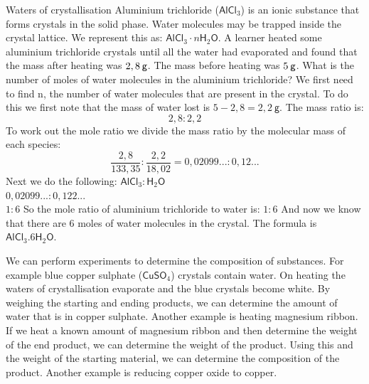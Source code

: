     \noindent
\par
            \label{m38712*eid672431}\vspace{-3cm} 
      \noindent
      \begin{wex}{Waters of crystallisation}{
\label{m38712*pid47982}
\label{m38712*id64827}Aluminium trichloride (${\mathsf{AlCl}}_{3}$) is an ionic substance that forms crystals in the solid phase. Water molecules may be trapped inside the crystal lattice. We represent this as: ${\mathsf{AlCl}}_{3}\ensuremath{\cdot}n{\mathsf{H}}_{2}\mathsf{O}$. A learner heated some aluminium trichloride crystals until all the water had evaporated and found that the mass after heating was $2,8\phantom{\rule{2pt}{0ex}}\mathsf{g}$. The mass before heating was $5\phantom{\rule{2pt}{0ex}}\mathsf{g}$. What is the number of moles of water molecules in the aluminium trichloride?
\vspace{5pt}}
{
We first need to find n, the number of water molecules that are present in the crystal. To do this we first note that the mass of water lost is $5-2,8=2,2~\mathsf{g}$.
  \label{m38712*id3892}The mass ratio is:
 \label{m38712*eid744672}\nopagebreak\noindent{}
    \begin{equation*}
    2,8:2,2
      \end{equation*}
To work out the mole ratio we divide the mass ratio by the molecular mass of each species:
\label{m38712*eid7459432}\nopagebreak\noindent{}
    \begin{equation*}
    \frac{2,8}{133,35}:\frac{2,2}{18,02}=0,02099...:0,12...
      \end{equation*}
Next we do the following:
$\mathsf{AlCl}_{3}:\mathsf{H}_{2}\mathsf{O}$\\
$0,02099...:0,122...$ \\
$1:6$
So the mole ratio of aluminium trichloride to water is: $1:6$
And now we know that there are 6 moles of water molecules in the crystal. The formula is $\mathsf{AlCl}_{3}.6\mathsf{H}_{2}\mathsf{O}$.
}
    \end{wex}
We can perform experiments to determine the composition of substances. For example blue copper sulphate ($\mathsf{CuSO}_{4}$) crystals contain water. On heating the waters of crystallisation evaporate and the blue crystals become white. By weighing the starting and ending products, we can determine the amount of water that is in copper sulphate. Another example is heating magnesium ribbon. If we heat a known amount of magnesium ribbon and then determine the weight of the end product, we can determine the weight of the product. Using this and the weight of the starting material, we can determine the composition of the product. Another example is reducing copper oxide to copper. 

